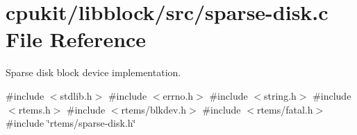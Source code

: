 \hypertarget{sparse-disk_8c}{}\section{cpukit/libblock/src/sparse-\/disk.c File Reference}
\label{sparse-disk_8c}


Sparse disk block device implementation.  


{\ttfamily \#include $<$stdlib.\+h$>$}\newline
{\ttfamily \#include $<$errno.\+h$>$}\newline
{\ttfamily \#include $<$string.\+h$>$}\newline
{\ttfamily \#include $<$rtems.\+h$>$}\newline
{\ttfamily \#include $<$rtems/blkdev.\+h$>$}\newline
{\ttfamily \#include $<$rtems/fatal.\+h$>$}\newline
{\ttfamily \#include \char`\"{}rtems/sparse-\/disk.\+h\char`\"{}}\newline
